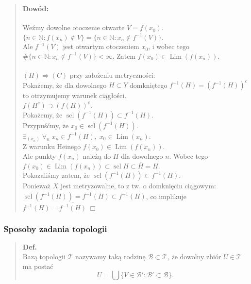 \documentclass[10pt,a4paper]{article}
\begin{document}
{\begin{quote}
    \begin{tcolorbox}[mybox]
    \textbf{Dowód:}\\\\
    Weźmy dowolne otoczenie otwarte $V = f(x_0)$.\\
    $\{n \in \mathbb{N} : f(x_n) \notin V\} = \{n \in \mathbb{N} : x_n \notin f^{-1}(V)\}$.\\
    Ale $f^{-1}(V)$ jest otwartym otoczeniem $x_0$, i wobec tego\\
    $\#\{n \in \mathbb{N} : x_n \notin f^{-1}(V)\} < \infty$. Zatem $f(x_0) \in \operatorname{Lim}(f(x_n))$.\\\\
    $(H) \Rightarrow (C)$ przy założeniu metryczności:\\
    Pokażemy, że dla dowolnego $H \subset Y$ domkniętego $f^{-1}(H) = (f^{-1}(H))^c$ to otrzymujemy warunek ciągłości.\\
    $f(H^c) \supset (f(H))^c$.\\
    Pokażemy, że $\operatorname{scl}(f^{-1}(H)) \subset f^{-1}(H)$.\\
    Przypuśćmy, że $x_0 \in \operatorname{scl}(f^{-1}(H))$.\\
    $\exists_{(x_n)}\; \forall_n \; x_n \in f^{-1}(H),\; x_0 \in \operatorname{Lim}(x_n)$.\\
    Z warunku Heinego $f(x_0) \in \operatorname{Lim}(f(x_n))$.\\
    Ale punkty $f(x_n)$ należą do $H$ dla dowolnego $n$. Wobec tego $f(x_0) \in \operatorname{Lim}(f(x_n)) \subset \operatorname{scl} H \subset \overline{H} = H$.\\
    Pokazaliśmy zatem, że $\operatorname{scl}(f^{-1}(H)) \subset f^{-1}(H)$.\\
    Ponieważ $X$ jest metryzowalne, to z tw. o domknięciu ciągowym:\\
    $\operatorname{scl}(f^{-1}(H)) = \overline{f^{-1}(H)} \subset f^{-1}(H)$, co implikuje $f^{-1}(H) = \overline{f^{-1}(H)} \;\Box$
    \end{tcolorbox}
    \end{quote}

    \subsubsection*{Sposoby zadania topologii}
    \begin{quote}
    \textbf{Def.}\\
    Bazą topologii $\mathcal{T}$ nazywamy taką rodzinę $\mathcal{B} \subset \mathcal{T}$, że dowolny zbiór $U \in \mathcal{T}$ ma postać \\
    $$U = \bigcup \{V \in \mathcal{B}' : \mathcal{B}' \subset \mathcal{B}\}.$$


\end{quote}}
\end{document}
